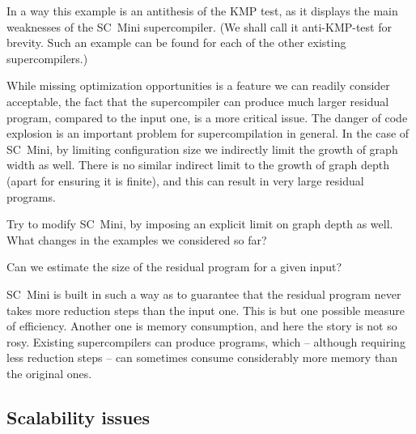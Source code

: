 In a way this example is an antithesis of the KMP test, as it displays the
main weaknesses of the SC~Mini supercompiler.
(We shall call it anti-KMP-test for brevity. Such an example can be found for 
each of the other existing supercompilers.)

While missing optimization opportunities is a feature we can readily consider acceptable,
the fact that the supercompiler can produce much larger residual program, compared to
the input one, is a more critical issue.
The danger of code explosion is an important problem for supercompilation in general.
In the case of SC~Mini, by limiting configuration size we indirectly limit
the growth of graph width as well. 
There is no similar indirect limit
to the growth of graph depth (apart for ensuring it is finite),
and this can result in very large residual programs.

\begin{exercise}
Try to modify SC~Mini, by imposing an explicit limit on graph depth as well. 
What changes in the examples we considered so far?
\end{exercise}

\begin{exercise}
Can we estimate the size of the residual program for a given input?
\end{exercise}



SC~Mini is built in such a way as to guarantee that the residual program never takes more 
reduction steps than the input one. This is but one possible measure of efficiency.
Another one is memory consumption, and here the story is not so rosy.
Existing supercompilers can produce programs, which -- although requiring
less reduction steps -- can sometimes consume considerably more memory 
than the original ones.

\subsection{Scalability issues}

